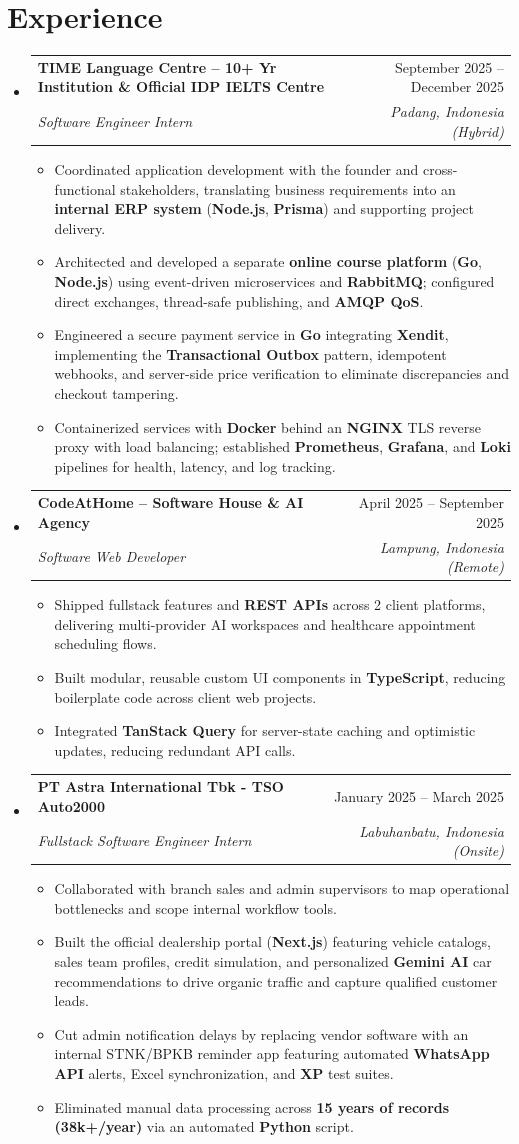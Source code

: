 \documentclass[letterpaper,11pt]{article}
\makeatletter
\newcommand{\resumeItem}[1]{\item\small{#1}}
\newcommand{\resumeSubheading}[4]{
  \item
    \begin{tabular*}{\textwidth}[t]{l@{\extracolsep{\fill}}r}
      \textbf{#1} & #2 \\
      \textit{\small#3} & \textit{\small #4} \\
    \end{tabular*}\vspace{-2pt}
}
\newcommand{\resumeSubHeadingListStart}{\begin{itemize}[leftmargin=0in, label={}, itemsep=0.8pt, parsep=0pt, topsep=0.4pt]}
\newcommand{\resumeSubHeadingListEnd}{\end{itemize}\vspace{-2pt}}
\newcommand{\resumeItemListStart}{\begin{itemize}[leftmargin=12pt, label=\tiny$\bullet$, itemsep=0.8pt, parsep=0pt, topsep=0.4pt]}
\newcommand{\resumeItemListEnd}{\end{itemize}}
\makeatother
\begin{document}
\section{Experience}
  \resumeSubHeadingListStart
    \resumeSubheading
      {TIME Language Centre \textnormal{\small -- 10+ Yr Institution \& Official IDP IELTS Centre}}{September 2025 -- December 2025}
      {Software Engineer Intern}{Padang, Indonesia (Hybrid)}
      \resumeItemListStart
        \resumeItem{Coordinated application development with the founder and cross-functional stakeholders, translating business requirements into an \textbf{internal ERP system} (\textbf{Node.js}, \textbf{Prisma}) and supporting project delivery.}
        \resumeItem{Architected and developed a separate \textbf{online course platform} (\textbf{Go}, \textbf{Node.js}) using event-driven microservices and \textbf{RabbitMQ}; configured direct exchanges, thread-safe publishing, and \textbf{AMQP QoS}.}
        \resumeItem{Engineered a secure payment service in \textbf{Go} integrating \textbf{Xendit}, implementing the \textbf{Transactional Outbox} pattern, idempotent webhooks, and server-side price verification to eliminate discrepancies and checkout tampering.}
        \resumeItem{Containerized services with \textbf{Docker} behind an \textbf{NGINX} TLS reverse proxy with load balancing; established \textbf{Prometheus}, \textbf{Grafana}, and \textbf{Loki} pipelines for health, latency, and log tracking.}
      \resumeItemListEnd 

    \resumeSubheading
      {CodeAtHome \textnormal{\small -- Software House \& AI Agency}}{April 2025 -- September 2025}
      {Software Web Developer}{Lampung, Indonesia (Remote)}
      \resumeItemListStart
        \resumeItem{Shipped fullstack features and \textbf{REST APIs} across 2 client platforms, delivering multi-provider AI workspaces and healthcare appointment scheduling flows.}
        \resumeItem{Built modular, reusable custom UI components in \textbf{TypeScript}, reducing boilerplate code across client web projects.}
        \resumeItem{Integrated \textbf{TanStack Query} for server-state caching and optimistic updates, reducing redundant API calls.}
      \resumeItemListEnd

    \resumeSubheading
      {PT Astra International Tbk - TSO Auto2000}{January 2025 -- March 2025}
      {Fullstack Software Engineer Intern}{Labuhanbatu, Indonesia (Onsite)}
      \resumeItemListStart
        \resumeItem{Collaborated with branch sales and admin supervisors to map operational bottlenecks and scope internal workflow tools.}
        \resumeItem{Built the official dealership portal (\textbf{Next.js}) featuring vehicle catalogs, sales team profiles, credit simulation, and personalized \textbf{Gemini AI} car recommendations to drive organic traffic and capture qualified customer leads.}
        \resumeItem{Cut admin notification delays by replacing vendor software with an internal STNK/BPKB reminder app featuring automated \textbf{WhatsApp API} alerts, Excel synchronization, and \textbf{XP} test suites.}
        \resumeItem{Eliminated manual data processing across \textbf{15 years of records (38k+/year)} via an automated \textbf{Python} script.}
      \resumeItemListEnd
  \resumeSubHeadingListEnd
\end{document}
